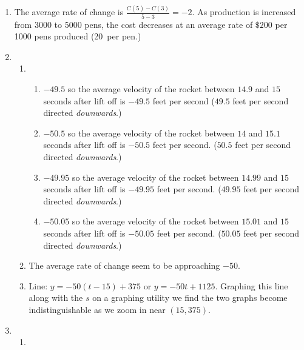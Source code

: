 \begin{enumerate}
\item The average rate of change is $\frac{C(5)-C(3)}{5-3}=-2$.  As production is increased from 3000 to 5000 pens, the cost decreases at an average rate of  $\$200$ per 1000 pens produced (20\textcent \, per pen.)


\item 

\begin{enumerate}

\item

\begin{enumerate}

\item  $-49.5$ so the average velocity of the rocket between $14.9$ and $15$ seconds after lift off is $-49.5$ feet per second ($49.5$ feet per second directed \textit{downwards}.)

\item  $-50.5$ so the average velocity of the rocket between $14$ and $15.1$ seconds after lift off is $-50.5$ feet per second. ($50.5$ feet per second directed \textit{downwards}.)

\item  $-49.95$ so the average velocity of the rocket between $14.99$ and $15$ seconds after lift off is $-49.95$ feet per second. ($49.95$ feet per second directed \textit{downwards}.)

\item   $-50.05$ so the average velocity of the rocket between $15.01$ and $15$ seconds after lift off is $-50.05$ feet per second. ($50.05$ feet per second directed \textit{downwards}.)
\end{enumerate}


\item  The average rate of change seem to be approaching $-50$.

\item  Line:  $y = -50(t-15) + 375$ or $y =   -50t + 1125$.  Graphing this line along with the $s$ on a graphing utility we find the two graphs become indistinguishable as we zoom in near $(15, 375)$.

\end{enumerate}

\enlargethispage{0.5in}

\addtocounter{enumi}{3}

\item \begin{enumerate}

 \item 
 

\end{enumerate}
\end{enumerate}

